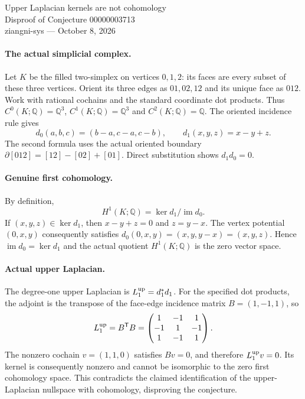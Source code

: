 \documentclass[11pt]{article}
\begin{document}
\begin{center}
{\Large Upper Laplacian kernels are not cohomology}\\[4pt]
Disproof of Conjecture 00000003713\\[4pt]
ziangni-sys --- October 8, 2026
\end{center}
\paragraph{The actual simplicial complex.}
Let $K$ be the filled two-simplex on vertices $0,1,2$: its faces
are every subset of these three vertices. Orient its three edges
as $01,02,12$ and its unique face as $012$. Work with rational
cochains and the standard coordinate dot products. Thus
$C^0(K;\mathbb Q)=\mathbb Q^3$, $C^1(K;\mathbb Q)=\mathbb Q^3$
and $C^2(K;\mathbb Q)=\mathbb Q$. The oriented incidence rule gives
\[
 d_0(a,b,c)=(b-a,c-a,c-b),\qquad d_1(x,y,z)=x-y+z.
\]
The second formula uses the actual oriented boundary
$\partial[012]=[12]-[02]+[01]$. Direct substitution shows
$d_1d_0=0$.

\paragraph{Genuine first cohomology.}
By definition,
\[
 H^1(K;\mathbb Q)=\ker d_1/\operatorname{im}d_0.
\]
If $(x,y,z)\in\ker d_1$, then $x-y+z=0$ and $z=y-x$.
The vertex potential $(0,x,y)$ consequently satisfies
$d_0(0,x,y)=(x,y,y-x)=(x,y,z)$. Hence
$\operatorname{im}d_0=\ker d_1$ and the actual quotient
$H^1(K;\mathbb Q)$ is the zero vector space.

\paragraph{Actual upper Laplacian.}
The degree-one upper Laplacian is $L_1^{\rm up}=d_1^*d_1$.
For the specified dot products, the adjoint is the transpose of
the face-edge incidence matrix $B=(1,-1,1)$, so
\[
 L_1^{\rm up}=B^{\mathsf T}B=
 \begin{pmatrix}1&-1&1\\-1&1&-1\\1&-1&1\end{pmatrix}.
\]
The nonzero cochain $v=(1,1,0)$ satisfies $Bv=0$, and therefore
$L_1^{\rm up}v=0$. Its kernel is consequently nonzero and cannot
be isomorphic to the zero first cohomology space. This contradicts
the claimed identification of the upper-Laplacian nullspace with
cohomology, disproving the conjecture.
\end{document}
